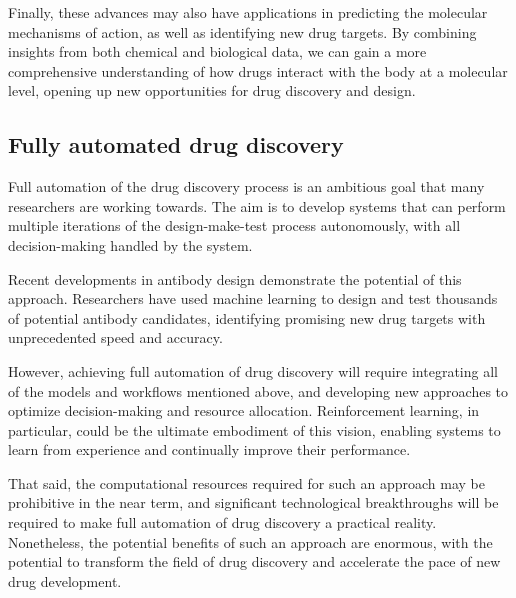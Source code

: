 Finally, these advances may also have applications in predicting the molecular mechanisms of action, as well as identifying new drug targets. By combining insights from both chemical and biological data, we can gain a more comprehensive understanding of how drugs interact with the body at a molecular level, opening up new opportunities for drug discovery and design.

\subsection{Fully automated drug discovery}
Full automation of the drug discovery process is an ambitious goal that many researchers are working towards. The aim is to develop systems that can perform multiple iterations of the design-make-test process autonomously, with all decision-making handled by the system.

Recent developments in antibody design demonstrate the potential of this approach. Researchers have used machine learning to design and test thousands of potential antibody candidates, identifying promising new drug targets with unprecedented speed and accuracy.

However, achieving full automation of drug discovery will require integrating all of the models and workflows mentioned above, and developing new approaches to optimize decision-making and resource allocation. Reinforcement learning, in particular, could be the ultimate embodiment of this vision, enabling systems to learn from experience and continually improve their performance.

That said, the computational resources required for such an approach may be prohibitive in the near term, and significant technological breakthroughs will be required to make full automation of drug discovery a practical reality. Nonetheless, the potential benefits of such an approach are enormous, with the potential to transform the field of drug discovery and accelerate the pace of new drug development.
